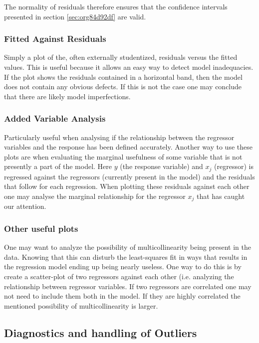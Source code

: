 \documentclass[11pt]{article}
\begin{document}
The normality of residuals therefore ensures that the confidence intervals presented in section \ref{sec:org84d92df}
are valid.

\subsubsection{Fitted Against Residuals}
\label{sec:org60e6399}

Simply a plot of the, often externally studentized, residuals versus the fitted values. This is useful
because it allows an easy way to detect model inadequacies. If the plot shows the residuals contained in
a horizontal band, then the model does not contain any obvious defects. If this is not the case one may
conclude that there are likely model imperfections.

\subsubsection{Added Variable Analysis}
\label{sec:orgedb50d3}

Particularly useful when analysing if the relationship between the regressor variables and the response
has been defined accurately. Another way to use these plots are when evaluating the marginal usefulness
of some variable that is not presently a part of the model. Here \(y\) (the response variable) and \(x_j\)
(regressor) is regressed against the regressors (currently present in the model) and the residuals that
follow for each regression. When plotting these residuals against each other one may analyse the marginal
relationship for the regressor \(x_j\) that has caught our attention.

\subsubsection{Other useful plots}
\label{sec:org6b7ac07}

One may want to analyze the possibility of multicollinearity being present in the data. Knowing that
this can disturb the least-squares fit in ways that results in the regression model ending up being
nearly useless. One way to do this is by create a scatter-plot of two regressors against each other
(i.e. analyzing the relationship between regressor variables. If two regressors are correlated one 
may not need to include them both in the model. If they are highly correlated the mentioned possibility 
of multicollinearity is larger. 

\subsection{Diagnostics and handling of Outliers}
\label{sec:org02ed5a1}
\end{document}
